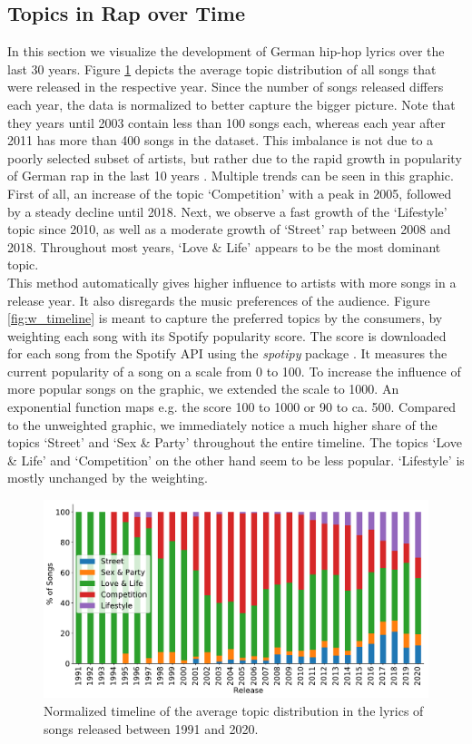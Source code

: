 \documentclass[conference]{IEEEtran}
\begin{document}
\subsection{Topics in Rap over Time}
In this section we visualize the development of German hip-hop lyrics over the last 30 years. Figure \ref{fig:timeline} depicts the average topic distribution of all songs that were released in the respective year. Since the number of songs released differs each year, the data is normalized to better capture the bigger picture. Note that they years until 2003 contain less than 100 songs each, whereas each year after 2011 has more than 400 songs in the dataset. This imbalance is not due to a poorly selected subset of artists, but rather due to the rapid growth in popularity of German rap in the last 10 years \cite{musikindustrie}. Multiple trends can be seen in this graphic. First of all, an increase of the topic {\lq}Competition{\rq} with a peak in 2005, followed by a steady decline until 2018. Next, we observe a fast growth of the {\lq}Lifestyle{\rq} topic since 2010, as well as a moderate growth of {\lq}Street{\rq} rap between 2008 and 2018. Throughout most years, {\lq}Love \& Life{\rq} appears to be the most dominant topic.\\
This method automatically gives higher influence to artists with more songs in a release year. It also disregards the music preferences of the audience. Figure \ref{fig:w_timeline} is meant to capture the preferred topics by the consumers, by weighting each song with its Spotify popularity score. The score is downloaded for each song from the Spotify API using the \textit{spotipy} package \cite{spotipy}. It measures the current popularity of a song on a scale from 0 to 100. To increase the influence of more popular songs on the graphic, we extended the scale to 1000. An exponential function maps e.g. the score 100 to 1000 or 90 to ca. 500. Compared to the unweighted graphic, we immediately notice a much higher share of the topics {\lq}Street{\rq} and {\lq}Sex \& Party{\rq} throughout the entire timeline. The topics {\lq}Love \& Life{\rq} and {\lq}Competition{\rq} on the other hand seem to be less popular. {\lq}Lifestyle{\rq} is mostly unchanged by the weighting.

\begin{figure}[!t]
\includegraphics[width=\linewidth]{figures/timeline.pdf}
\vspace*{-8mm}
\caption{Normalized timeline of the average topic distribution in the lyrics of songs released between 1991 and 2020.}
\label{fig:timeline}
\end{figure}
\end{document}
